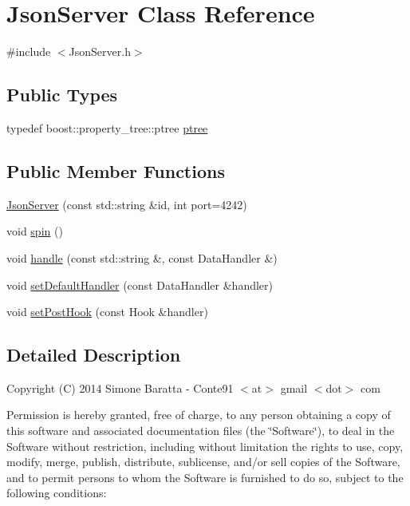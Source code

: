 \hypertarget{class_json_server}{\section{Json\+Server Class Reference}
\label{class_json_server}
}


{\ttfamily \#include $<$Json\+Server.\+h$>$}

\subsection*{Public Types}
\begin{DoxyCompactItemize}
\item 
typedef boost\+::property\+\_\+tree\+::ptree \hyperlink{class_json_server_ab33e8e19d7224157c203637791e09ea2}{ptree}
\end{DoxyCompactItemize}
\subsection*{Public Member Functions}
\begin{DoxyCompactItemize}
\item 
\hyperlink{class_json_server_a612055ec4c99985bf0f763e5f4b6d593}{Json\+Server} (const std\+::string \&id, int port=4242)
\item 
void \hyperlink{class_json_server_a1aea749817cbcf5245b232108190ac84}{spin} ()
\item 
void \hyperlink{class_json_server_a5a069947bb7027e35232541513c970ae}{handle} (const std\+::string \&, const Data\+Handler \&)
\item 
void \hyperlink{class_json_server_a3426c18b348fd43d3f63954701de23b0}{set\+Default\+Handler} (const Data\+Handler \&handler)
\item 
void \hyperlink{class_json_server_a325173dfe3a5867445e804f7d415b3b3}{set\+Post\+Hook} (const Hook \&handler)
\end{DoxyCompactItemize}


\subsection{Detailed Description}
Copyright (C) 2014 Simone Baratta -\/ Conte91 $<$at$>$ gmail $<$dot$>$ com

Permission is hereby granted, free of charge, to any person obtaining a copy of this software and associated documentation files (the \char`\"{}\+Software\char`\"{}), to deal in the Software without restriction, including without limitation the rights to use, copy, modify, merge, publish, distribute, sublicense, and/or sell copies of the Software, and to permit persons to whom the Software is furnished to do so, subject to the following conditions\+:

